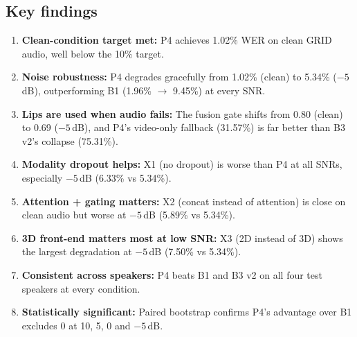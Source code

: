 
\subsection{Key findings}

\begin{enumerate}
\item \textbf{Clean-condition target met:} P4 achieves 1.02\% WER on clean GRID audio, well below the 10\% target.
\item \textbf{Noise robustness:} P4 degrades gracefully from 1.02\% (clean) to 5.34\% ($-5$\,dB), outperforming B1 (1.96\% $\to$ 9.45\%) at every SNR.
\item \textbf{Lips are used when audio fails:} The fusion gate shifts from 0.80 (clean) to 0.69 ($-5$\,dB), and P4's video-only fallback (31.57\%) is far better than B3 v2's collapse (75.31\%).
\item \textbf{Modality dropout helps:} X1 (no dropout) is worse than P4 at all SNRs, especially $-5$\,dB (6.33\% vs 5.34\%).
\item \textbf{Attention + gating matters:} X2 (concat instead of attention) is close on clean audio but worse at $-5$\,dB (5.89\% vs 5.34\%).
\item \textbf{3D front-end matters most at low SNR:} X3 (2D instead of 3D) shows the largest degradation at $-5$\,dB (7.50\% vs 5.34\%).
\item \textbf{Consistent across speakers:} P4 beats B1 and B3 v2 on all four test speakers at every condition.
\item \textbf{Statistically significant:} Paired bootstrap confirms P4's advantage over B1 excludes 0 at 10, 5, 0 and $-5$\,dB.
\end{enumerate}

